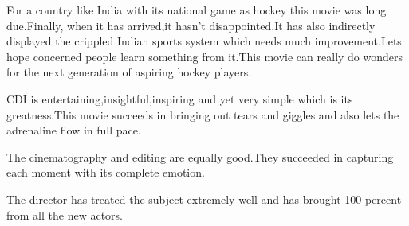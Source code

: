 \documentclass[]{article}
\begin{document}
For a country like India with its national game as hockey this movie was long due.Finally, when it has arrived,it hasn't disappointed.It has also indirectly displayed the crippled Indian sports system which needs much improvement.Lets hope concerned people learn something from it.This movie can really do wonders for the next generation of aspiring hockey players.

CDI is entertaining,insightful,inspiring and yet very simple which is its greatness.This movie succeeds in bringing out tears and giggles and also lets the adrenaline flow in full pace.

The cinematography and editing are equally good.They succeeded in capturing each moment with its complete emotion.

The director has treated the subject extremely well and has brought 100 percent from all the new actors.
\end{document}
